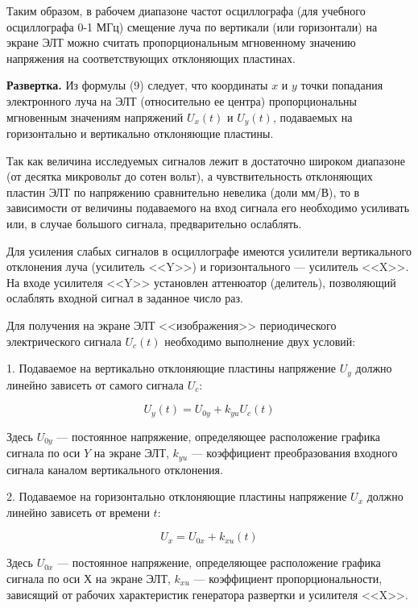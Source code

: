 \documentclass[14pt]{article}
\begin{document}
Таким образом, в рабочем диапазоне  частот осциллографа (для учебного осциллографа 0-1 МГц) смещение луча по вертикали (или горизонтали) на экране ЭЛТ можно считать пропорциональным мгновенному значению напряжения на соответствующих отклоняющих пластинах.

%
%

\vspace{0.5cm}
\textbf{Развертка.} Из формулы (9) следует, что координаты $x$ и $y$ точки попадания электронного луча на ЭЛТ (относительно ее центра) пропорциональны мгновенным значениям напряжений $U_x(t)$  и $U_y(t)$, подаваемых на горизонтально и вертикально отклоняющие пластины.

Так как величина исследуемых сигналов лежит в достаточно широком диапазоне (от десятка микровольт до сотен вольт), а чувствительность отклоняющих пластин ЭЛТ по напряжению сравнительно невелика (доли мм/В), то в зависимости от величины подаваемого на вход сигнала его необходимо усиливать или, в случае большого сигнала, предварительно ослаблять.

Для усиления слабых сигналов в осциллографе имеются усилители вертикального отклонения луча (усилитель <<Y>>) и горизонтального ---  усилитель <<X>>. На входе усилителя <<Y>> установлен аттенюатор (делитель), позволяющий ослаблять входной сигнал в заданное число раз.

Для получения на экране ЭЛТ <<изображения>> периодического электрического сигнала $U_c(t)$ необходимо выполнение двух условий:

1. Подаваемое на вертикально отклоняющие пластины напряжение $U_y$ должно линейно зависеть от самого сигнала $U_c$:

\begin{equation}
U_y(t) = U_{0y} + k_{yu}U_c(t)
\end{equation}

\noindent Здесь $U_{0y}$ --- постоянное напряжение, определяющее расположение графика сигнала по оси $Y$ на экране ЭЛТ, $k_{yu}$ — коэффициент преобразования входного сигнала каналом вертикального отклонения.

2. Подаваемое на горизонтально отклоняющие пластины напряжение $U_x$ должно линейно зависеть от времени $t$:

\begin{equation}
U_x = U_{0x} + k_{xu}(t)
\end{equation}

\noindent Здесь $U_{0x}$ — постоянное напряжение, определяющее расположение графика сигнала по оси Х на экране ЭЛТ, $k_{xu}$ — коэффициент пропорциональности, зависящий от рабочих характеристик генератора развертки и усилителя <<X>>.
\end{document}

